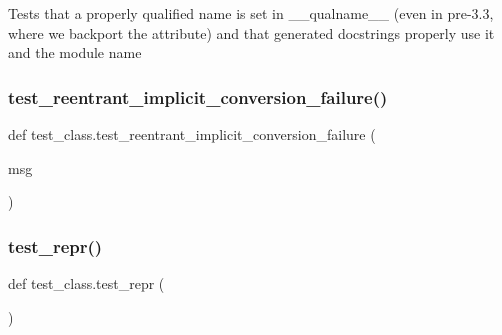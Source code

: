 \begin{DoxyVerb}Tests that a properly qualified name is set in __qualname__ (even in pre-3.3, where we
backport the attribute) and that generated docstrings properly use it and the module name\end{DoxyVerb}
 \mbox{\label{namespacetest__class_a8cd6c6d851403dbb363b293e59bbcb9e}} 
\subsubsection{\texorpdfstring{test\_reentrant\_implicit\_conversion\_failure()}{test\_reentrant\_implicit\_conversion\_failure()}}
{\footnotesize\ttfamily def test\+\_\+class.\+test\+\_\+reentrant\+\_\+implicit\+\_\+conversion\+\_\+failure (\begin{DoxyParamCaption}\item[{}]{msg }\end{DoxyParamCaption})}

\mbox{\label{namespacetest__class_a206c8002ac513ddb5785894b09972933}} 
\subsubsection{\texorpdfstring{test\_repr()}{test\_repr()}}
{\footnotesize\ttfamily def test\+\_\+class.\+test\+\_\+repr (\begin{DoxyParamCaption}{ }\end{DoxyParamCaption})}

